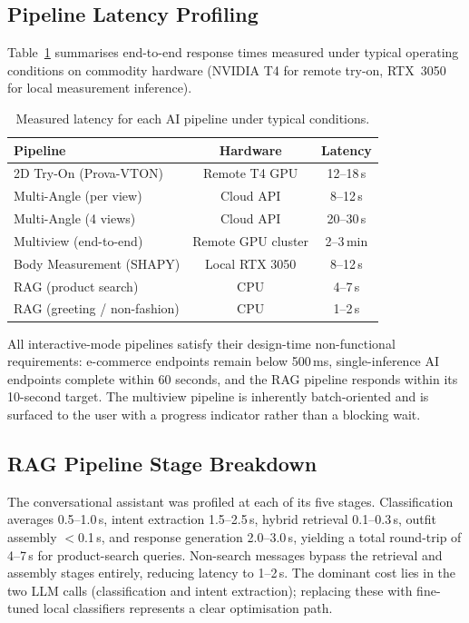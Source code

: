 \subsection{Pipeline Latency Profiling}

Table~\ref{tab:latency} summarises end-to-end response times measured under typical operating conditions on commodity hardware (NVIDIA T4 for remote try-on, RTX~3050 for local measurement inference).

\begin{table}[H]
\caption{Measured latency for each AI pipeline under typical conditions.}
\label{tab:latency}
\centering
\begin{tabular}{l c c}
\toprule
\textbf{Pipeline} & \textbf{Hardware} & \textbf{Latency} \\
\midrule
2D Try-On (Prova-VTON) & Remote T4 GPU & 12--18\,s \\
Multi-Angle (per view) & Cloud API & 8--12\,s \\
Multi-Angle (4 views) & Cloud API & 20--30\,s \\
Multiview (end-to-end) & Remote GPU cluster & 2--3\,min \\
Body Measurement (SHAPY) & Local RTX 3050 & 8--12\,s \\
RAG (product search) & CPU & 4--7\,s \\
RAG (greeting / non-fashion) & CPU & 1--2\,s \\
\bottomrule
\end{tabular}
\end{table}

All interactive-mode pipelines satisfy their design-time non-functional requirements: e-commerce endpoints remain below 500\,ms, single-inference AI endpoints complete within 60 seconds, and the RAG pipeline responds within its 10-second target. The multiview pipeline is inherently batch-oriented and is surfaced to the user with a progress indicator rather than a blocking wait.

\subsection{RAG Pipeline Stage Breakdown}

The conversational assistant was profiled at each of its five stages. Classification averages 0.5--1.0\,s, intent extraction 1.5--2.5\,s, hybrid retrieval 0.1--0.3\,s, outfit assembly $<$0.1\,s, and response generation 2.0--3.0\,s, yielding a total round-trip of 4--7\,s for product-search queries. Non-search messages bypass the retrieval and assembly stages entirely, reducing latency to 1--2\,s. The dominant cost lies in the two LLM calls (classification and intent extraction); replacing these with fine-tuned local classifiers represents a clear optimisation path.


